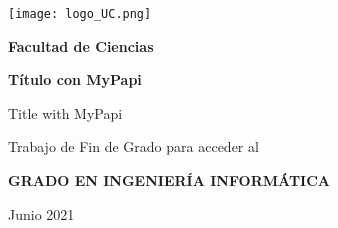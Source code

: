 
\begin{titlepage}
    \begin{center}
        \vspace*{1cm}
 
        \texttt{[image: logo\_UC.png]}

        \vspace{0.8cm}

        \textbf{Facultad de Ciencias}

        \vspace{1.0cm}

        \textbf{Título con MyPapi}
 
        \vspace{0.2cm}

         Title with MyPapi

        \vspace{1.5cm}

        Trabajo de Fin de Grado para acceder al

        \vspace{1.0cm}

        \textbf{GRADO EN INGENIERÍA INFORMÁTICA}
 
        \vfill


        Junio 2021
             
    \end{center}
 \end{titlepage}